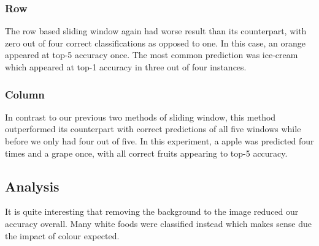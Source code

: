 \subsubsection*{Row}
The row based sliding window again had worse result than its counterpart, with
zero out of four correct classifications as opposed to one. In this case, an
orange appeared at top-5 accuracy once. The most common prediction was ice-cream
which appeared at top-1 accuracy in three out of four instances.

\subsubsection*{Column}
In contrast to our previous two methods of sliding window, this method
outperformed its counterpart with correct predictions of all five windows while
before we only had four out of five. In this experiment, a apple was predicted
four times and a grape once, with all correct fruits appearing to top-5
accuracy.

\subsection*{Analysis}
It is quite interesting that removing the background to the image reduced our
accuracy overall. Many white foods were classified instead which makes sense due
the impact of colour expected.
